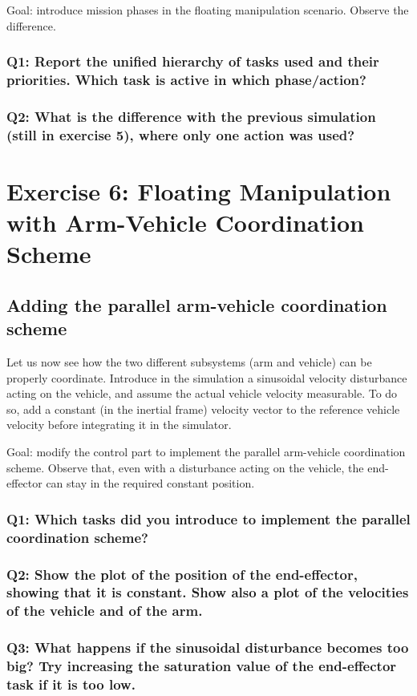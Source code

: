 \documentclass{article}
\begin{document}
Goal: introduce mission phases in the floating manipulation scenario. Observe the difference.

\subsubsection{Q1: Report the unified hierarchy of tasks used and their priorities. Which task is active in which phase/action?}

\subsubsection{Q2: What is the difference with the previous simulation (still in exercise 5), where only one action was used?}

\clearpage
\section{Exercise 6: Floating Manipulation with Arm-Vehicle Coordination Scheme}
\subsection{Adding the parallel arm-vehicle coordination scheme}
Let us now see how the two different subsystems (arm and vehicle) can be properly coordinate. Introduce in the simulation a sinusoidal velocity disturbance acting on the vehicle, and assume the actual vehicle velocity measurable. To do so, add a constant (in the inertial frame) velocity vector to the reference vehicle velocity before integrating it in the simulator. 

Goal: modify the control part to implement the parallel arm-vehicle coordination scheme. Observe that, even with a disturbance acting on the vehicle, the end-effector can stay in the required constant position.

\subsubsection{Q1: Which tasks did you introduce to implement the parallel coordination scheme?}

\subsubsection{Q2: Show the plot of the position of the end-effector, showing that it is constant. Show also a plot of the velocities of the vehicle and of the arm.}

\subsubsection{Q3: What happens if the sinusoidal disturbance becomes too big? Try increasing the saturation value of the end-effector task if it is too low.}
\end{document}
